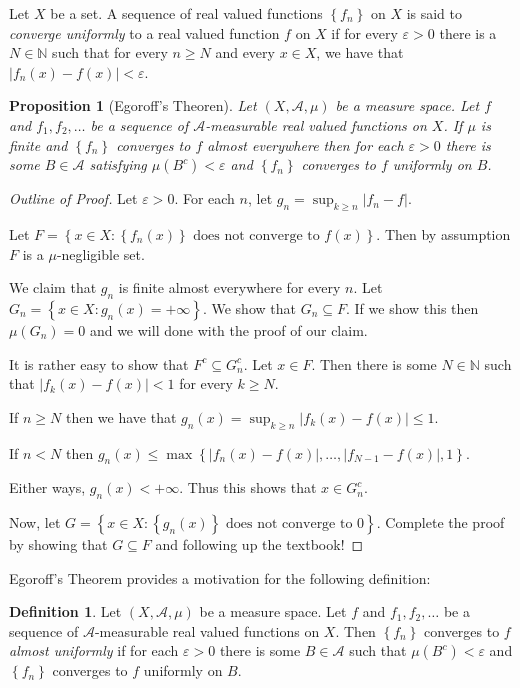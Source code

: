 \documentclass[12pt]{article}
\newtheorem{proposition}[theorem]{Proposition}
\theoremstyle{definition}
\newtheorem{definition}[theorem]{Definition}
\theoremstyle{remark}
\theoremstyle{plain}
\newcommand{\N}{\mathbb N}
\newcommand{\scrA}{{\mathscr A}}
\begin{document}
Let $X$ be a set. A sequence of real valued functions $\left\{ f_n \right\}$ on $X$ is said to \textit{converge uniformly} to a real valued function $f$ on $X$ if for every $\varepsilon > 0$ there is a $N \in \N$ such that for every $n\ge N$ and every $x\in X$, we have that $|f_n (x) - f(x)| < \varepsilon$.

\begin{proposition}[Egoroff's Theoren]
    Let $\left( X, \scrA , \mu \right)$ be a measure space. Let $f$ and $f_1 , f_2 , \ldots$ be a sequence of $\scrA$-measurable real valued functions on $X$. If $\mu$ is finite and $\left\{ f_n \right\}$ converges to $f$ almost everywhere then for each $\varepsilon >0$ there is some $B\in \scrA$ satisfying $\mu \left( B^c \right) < \varepsilon$ and $\left\{ f_n \right\} $ converges to $f$ uniformly on $B$.
\end{proposition}
\begin{proof}[Outline of Proof]
    Let $\varepsilon > 0$. For each $n$, let $g_n = \sup_{k\ge n} |f_n -f|$. 

    Let $F=\left\{ x\in X : \left\{ f_n \left( x \right) \right\} \text{ does not converge to } f\left( x \right) \right\}$. Then by assumption $F$ is a $\mu$-negligible set.

    We claim that $g_n$ is finite almost everywhere for every $n$. Let $G_n = \left\{ x \in X : g_n (x) = + \infty \right\}$. We show that $G_n \subseteq F$. If we show this then $\mu \left( G_n \right) = 0$ and we will done with the proof of our claim.

    It is rather easy to show that $F^c \subseteq G_n ^c$. Let $x\in F$. Then there is some $N\in\N$ such that $|f_k \left( x \right)- f(x)|<1$ for every $k\ge N$. 

    If $n\ge N$ then we have that $g_n (x) = \sup_{k\ge n} |f_k (x)- f(x)|\le 1$.

    If $n < N$ then $g_n (x)\le \max \left\{ |f_n (x) - f(x)|, \ldots , |f_{N-1}-f(x)| ,1 \right\}$.

    Either ways, $g_n (x) < +\infty$. Thus this shows that $x \in G_n^c$.

    Now, let $G=\left\{ x\in X : \left\{ g_n \left( x \right) \right\} \text{ does not converge to } 0 \right\}$. Complete the proof by showing that $G\subseteq F$ and following up the textbook!

\end{proof}


Egoroff's Theorem provides a motivation for the following definition: 
\begin{definition}
    Let $\left( X, \scrA , \mu \right)$ be a measure space. Let $f$ and $f_1 , f_2 , \ldots$ be a sequence of $\scrA$-measurable real valued functions on $X$. Then $\left\{ f_n \right\}$ converges to $f$ \textit{almost uniformly} if for each $\varepsilon > 0$ there is some $B\in \scrA$ such that $\mu \left( B^c \right) < \varepsilon$ and $\left\{ f_n \right\} $ converges to $f$ uniformly on $B$.
\end{definition}
\end{document}
